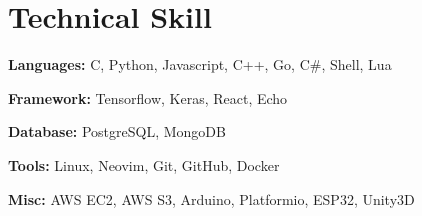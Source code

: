\section{Technical Skill}
    \begin{onecolentry}
        \textbf{Languages:} C, Python, Javascript, C++, Go, C\#, Shell, Lua
    \end{onecolentry}

    \vspace{0.2 cm}

    \begin{onecolentry}
        \textbf{Framework:} Tensorflow, Keras, React, Echo
    \end{onecolentry}

    \vspace{0.2 cm}

    \begin{onecolentry}
        \textbf{Database:} PostgreSQL, MongoDB
    \end{onecolentry}

    \vspace{0.2 cm}

    \begin{onecolentry}
        \textbf{Tools:} Linux, Neovim, Git, GitHub, Docker
    \end{onecolentry}

    \vspace{0.2 cm}

    \begin{onecolentry}
        \textbf{Misc:} AWS EC2, AWS S3, Arduino, Platformio, ESP32, Unity3D
    \end{onecolentry}
